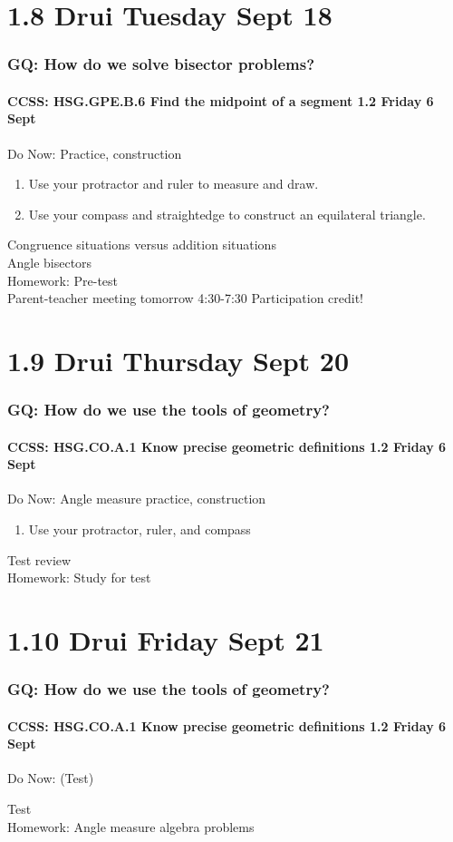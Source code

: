 \documentclass{beamer}
\begin{document}
\section{1.8 Drui Tuesday Sept 18}
  \frame
  {
    \frametitle{GQ: How do we solve bisector problems?}
    \framesubtitle{CCSS: HSG.GPE.B.6 Find the midpoint of a segment \hfill \alert{1.2 Friday 6 Sept}}

    \begin{block}{Do Now: Practice, construction}
    \begin{enumerate}
        \item Use your protractor and ruler to measure and draw.
        \item Use your compass and straightedge to construct an equilateral triangle.
    \end{enumerate}
    \end{block}
    Congruence situations versus addition situations\\
    Angle bisectors\\
    \vspace{1cm}
    Homework: Pre-test\\
    Parent-teacher meeting tomorrow 4:30-7:30 \alert{Participation credit!}
  }

\section{1.9 Drui Thursday Sept 20}
  \frame
  {
    \frametitle{GQ: How do we use the tools of geometry?}
    \framesubtitle{CCSS: HSG.CO.A.1 Know precise geometric definitions \hfill \alert{1.2 Friday 6 Sept}}

    \begin{block}{Do Now: Angle measure practice, construction}
    \begin{enumerate}
        \item Use your protractor, ruler, and compass
    \end{enumerate}
    \end{block}
    Test review\\
    \vspace{1cm}
    Homework: Study for test
  }

  \section{1.10 Drui Friday Sept 21}
    \frame
    {
      \frametitle{GQ: How do we use the tools of geometry?}
      \framesubtitle{CCSS: HSG.CO.A.1 Know precise geometric definitions \hfill \alert{1.2 Friday 6 Sept}}

      \begin{block}{Do Now: (Test)}
      \end{block}
      Test\\
      \vspace{1cm}
      Homework: Angle measure algebra problems
    }
\end{document}
